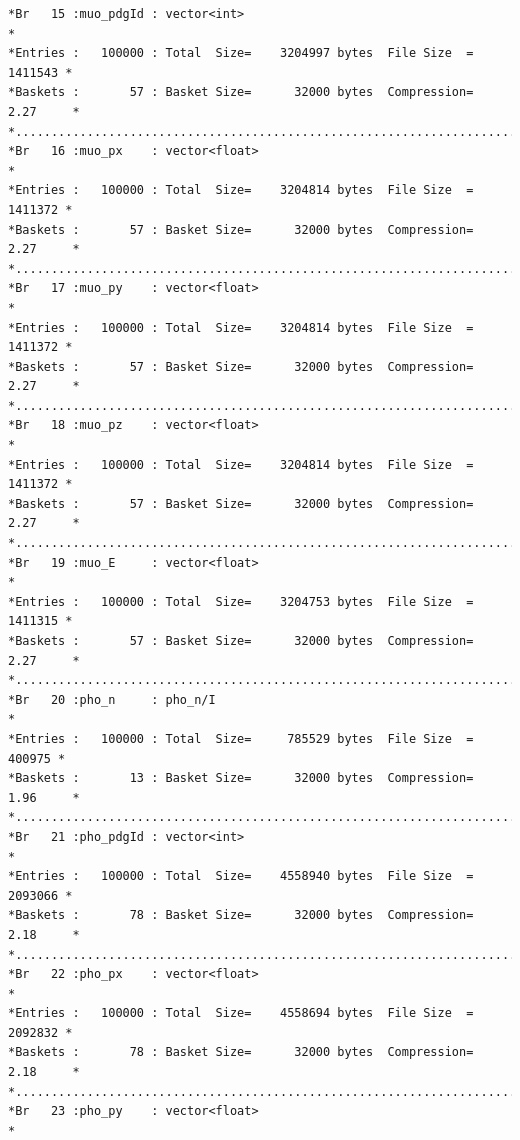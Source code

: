 {\begin{verbatim}
*Br   15 :muo_pdgId : vector<int>                                            *
*Entries :   100000 : Total  Size=    3204997 bytes  File Size  =    1411543 *
*Baskets :       57 : Basket Size=      32000 bytes  Compression=   2.27     *
*............................................................................*
*Br   16 :muo_px    : vector<float>                                          *
*Entries :   100000 : Total  Size=    3204814 bytes  File Size  =    1411372 *
*Baskets :       57 : Basket Size=      32000 bytes  Compression=   2.27     *
*............................................................................*
*Br   17 :muo_py    : vector<float>                                          *
*Entries :   100000 : Total  Size=    3204814 bytes  File Size  =    1411372 *
*Baskets :       57 : Basket Size=      32000 bytes  Compression=   2.27     *
*............................................................................*
*Br   18 :muo_pz    : vector<float>                                          *
*Entries :   100000 : Total  Size=    3204814 bytes  File Size  =    1411372 *
*Baskets :       57 : Basket Size=      32000 bytes  Compression=   2.27     *
*............................................................................*
*Br   19 :muo_E     : vector<float>                                          *
*Entries :   100000 : Total  Size=    3204753 bytes  File Size  =    1411315 *
*Baskets :       57 : Basket Size=      32000 bytes  Compression=   2.27     *
*............................................................................*
*Br   20 :pho_n     : pho_n/I                                                *
*Entries :   100000 : Total  Size=     785529 bytes  File Size  =     400975 *
*Baskets :       13 : Basket Size=      32000 bytes  Compression=   1.96     *
*............................................................................*
*Br   21 :pho_pdgId : vector<int>                                            *
*Entries :   100000 : Total  Size=    4558940 bytes  File Size  =    2093066 *
*Baskets :       78 : Basket Size=      32000 bytes  Compression=   2.18     *
*............................................................................*
*Br   22 :pho_px    : vector<float>                                          *
*Entries :   100000 : Total  Size=    4558694 bytes  File Size  =    2092832 *
*Baskets :       78 : Basket Size=      32000 bytes  Compression=   2.18     *
*............................................................................*
*Br   23 :pho_py    : vector<float>                                          *

\end{verbatim}}
